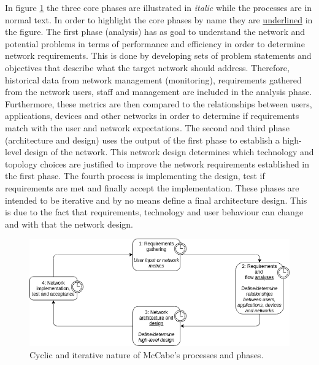 In figure \ref{fig:mccabe-process} the three core phases are illustrated in \textit{italic} while the processes are in normal text. In order to highlight the core phases by name they are \underline{underlined} in the figure. The first phase (analysis) has as goal to understand the network and potential problems in terms of performance and efficiency in order to determine network requirements. This is done by developing sets of problem statements and objectives that describe what the target network should address. Therefore, historical data from network management (monitoring), requirements gathered from the network users, staff and management are included in the analysis phase. Furthermore, these metrics are then compared to the relationships between users, applications, devices and other networks in order to determine if requirements match with the user and network expectations. The second and third phase (architecture and design) uses the output of the first phase to establish a high-level design of the network. This network design determines which technology and topology choices are justified to improve the network requirements established in the first phase. The fourth process is implementing the design, test if requirements are met and finally accept the implementation. These phases are intended to be iterative and by no means define a final architecture design. This is due to the fact that requirements, technology and user behaviour can change and with that the network design.

\begin{figure}[H]
\centering
\includegraphics[width=\columnwidth]{Images/mccabe-process.png}
\caption{Cyclic and iterative nature of McCabe's processes and phases.}
\label{fig:mccabe-process}
\end{figure}

